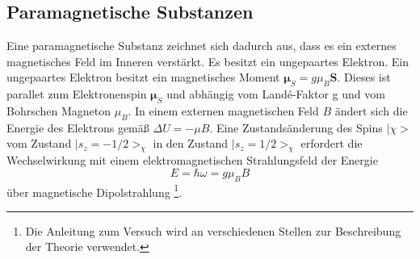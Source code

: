 \documentclass[a4paper,10pt]{scrartcl} %
\begin{document}
\subsection{Paramagnetische Substanzen}
Eine paramagnetische Substanz zeichnet sich dadurch aus, dass es ein externes magnetisches Feld im Inneren verstärkt. Es besitzt ein ungepaartes Elektron.
Ein ungepaartes Elektron besitzt ein magnetisches Moment $\boldsymbol{\mu}_S = g\mu_B\mathbf{S}$. Dieses ist parallet zum Elektronenspin $\boldsymbol{\mu}_S$ und abhängig vom Landé-Faktor g und vom Bohrschen Magneton $\mu_B$. In einem externen magnetischen Feld $B$ ändert sich die Energie des Elektrons gemäß $\Delta U = -\mu B$.
Eine Zustandsänderung des Spins $|\chi>$ vom Zustand $|s_z=-1/2>_{\chi}$ in den Zustand $|s_z=1/2>_{\chi}$ erfordert die Wechselwirkung mit einem elektromagnetischen Strahlungsfeld der Energie 
\begin{equation}
\label{eqn:dipol}
E = \hbar \omega = g\mu_BB
\end{equation}
über magnetische Dipolstrahlung \citep{Anleitung}\footnote{Die Anleitung zum Versuch wird an verschiedenen Stellen zur Beschreibung der Theorie verwendet.}.
\end{document}

